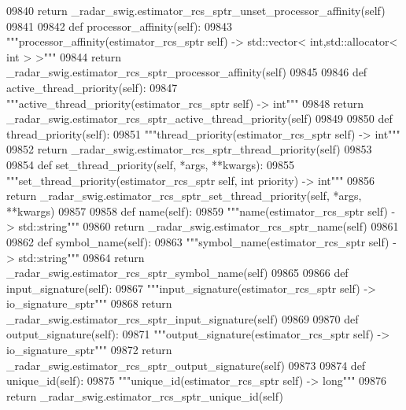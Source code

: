 \begin{DoxyCode}
{{{{{{{{{{{{{{{{{{{{{{{{{{{{{{{09840         \textcolor{keywordflow}{return} \_radar\_swig.estimator\_rcs\_sptr\_unset\_processor\_affinity(self)
09841 
09842     \textcolor{keyword}{def }processor_affinity(self):
09843         \textcolor{stringliteral}{"""processor\_affinity(estimator\_rcs\_sptr self) -> std::vector< int,std::allocator< int > >"""}
09844         \textcolor{keywordflow}{return} \_radar\_swig.estimator\_rcs\_sptr\_processor\_affinity(self)
09845 
09846     \textcolor{keyword}{def }active_thread_priority(self):
09847         \textcolor{stringliteral}{"""active\_thread\_priority(estimator\_rcs\_sptr self) -> int"""}
09848         \textcolor{keywordflow}{return} \_radar\_swig.estimator\_rcs\_sptr\_active\_thread\_priority(self)
09849 
09850     \textcolor{keyword}{def }thread_priority(self):
09851         \textcolor{stringliteral}{"""thread\_priority(estimator\_rcs\_sptr self) -> int"""}
09852         \textcolor{keywordflow}{return} \_radar\_swig.estimator\_rcs\_sptr\_thread\_priority(self)
09853 
09854     \textcolor{keyword}{def }set_thread_priority(self, *args, **kwargs):
09855         \textcolor{stringliteral}{"""set\_thread\_priority(estimator\_rcs\_sptr self, int priority) -> int"""}
09856         \textcolor{keywordflow}{return} \_radar\_swig.estimator\_rcs\_sptr\_set\_thread\_priority(self, *args, **kwargs)
09857 
09858     \textcolor{keyword}{def }name(self):
09859         \textcolor{stringliteral}{"""name(estimator\_rcs\_sptr self) -> std::string"""}
09860         \textcolor{keywordflow}{return} \_radar\_swig.estimator\_rcs\_sptr\_name(self)
09861 
09862     \textcolor{keyword}{def }symbol_name(self):
09863         \textcolor{stringliteral}{"""symbol\_name(estimator\_rcs\_sptr self) -> std::string"""}
09864         \textcolor{keywordflow}{return} \_radar\_swig.estimator\_rcs\_sptr\_symbol\_name(self)
09865 
09866     \textcolor{keyword}{def }input_signature(self):
09867         \textcolor{stringliteral}{"""input\_signature(estimator\_rcs\_sptr self) -> io\_signature\_sptr"""}
09868         \textcolor{keywordflow}{return} \_radar\_swig.estimator\_rcs\_sptr\_input\_signature(self)
09869 
09870     \textcolor{keyword}{def }output_signature(self):
09871         \textcolor{stringliteral}{"""output\_signature(estimator\_rcs\_sptr self) -> io\_signature\_sptr"""}
09872         \textcolor{keywordflow}{return} \_radar\_swig.estimator\_rcs\_sptr\_output\_signature(self)
09873 
09874     \textcolor{keyword}{def }unique_id(self):
09875         \textcolor{stringliteral}{"""unique\_id(estimator\_rcs\_sptr self) -> long"""}
09876         \textcolor{keywordflow}{return} \_radar\_swig.estimator\_rcs\_sptr\_unique\_id(self)
}}}}}}}}}}}}}}}}}}}}}}}}}}}}}}}
\end{DoxyCode}
